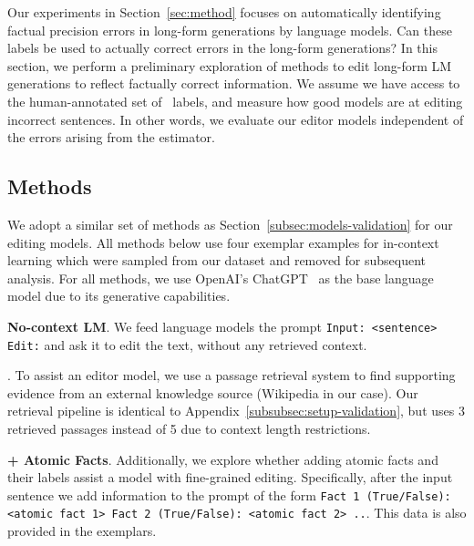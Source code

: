
Our experiments in Section~\ref{sec:method} focuses on automatically identifying factual precision errors in long-form generations by language models. Can these labels be used to actually correct errors in the long-form generations? In this section, we perform a preliminary exploration of methods to edit long-form LM generations to reflect factually correct information. We assume we have access to the human-annotated set of \ours\ labels, and measure how good models are at editing incorrect sentences. In other words, we evaluate our editor models independent of the errors arising from the estimator. %

\subsection{Methods}\label{subsubsec:editing-methods}

We adopt a similar set of methods as Section~\ref{subsec:models-validation} for our editing models. All methods below use four exemplar examples for in-context learning which were sampled from our dataset and removed for subsequent analysis. For all methods, we use OpenAI's ChatGPT~\citep{chatgpt} as the base language model due to its generative capabilities.
\vspace{.3em}

\noindent \textbf{No-context LM}. We feed language models the prompt \texttt{Input: <sentence> Edit:} and ask it to edit the text, without any retrieved context. 

\vspace{.3em}

\noindent \textbf{\rtgShort}. To assist an editor model, we use a passage retrieval system to find supporting evidence from an external knowledge source (Wikipedia in our case). Our retrieval pipeline is identical to Appendix~\ref{subsubsec:setup-validation}, but uses 3 retrieved passages instead of 5 due to context length restrictions.

\vspace{.3em}

\noindent \textbf{+ Atomic Facts}. Additionally, we explore whether adding atomic facts and their labels assist a model with fine-grained editing. Specifically, after the input sentence we add information to the prompt of the form \texttt{Fact 1 (True/False): <atomic fact 1> Fact 2 (True/False): <atomic fact 2> ..}. This data is also provided in the exemplars.

\vspace{.3em}

